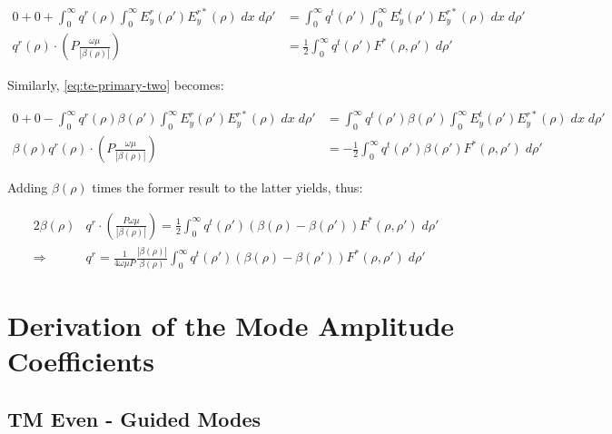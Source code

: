 \documentclass[11pt, oneside]{article}   	%
\begin{document}
\begin{align*}
0 + 0 + \int_{0}^{\infty} q^{r}(\rho) \int_{0}^{\infty} E_{y}^{r} (\rho ') E_{y}^{r*} (\rho) \; dx \; d\rho ' &= \int_{0}^{\infty} q^{t} (\rho ') \int_{0}^{\infty} E_{y}^{t}(\rho ') E_{y}^{r*}(\rho) \; dx \; d\rho ' \\
q^{r}(\rho) \cdot \left( P \frac{\omega \mu}{|\beta (\rho)|} \right) &= \frac{1}{2} \int_{0}^{\infty} q^{t} (\rho ') F^{*}(\rho, \rho') \; d\rho'
\end{align*}

\noindent Similarly, \eqref{eq:te-primary-two} becomes:

\begin{align*}
0 + 0 - \int_{0}^{\infty} q^{r}(\rho) \beta(\rho ') \int_{0}^{\infty} E_{y}^{r} (\rho ') E_{y}^{r*} (\rho) \; dx \; d\rho ' &= \int_{0}^{\infty} q^{t} (\rho ') \beta (\rho ') \int_{0}^{\infty} E_{y}^{t}(\rho ') E_{y}^{r*}(\rho) \; dx \; d\rho ' \\
\beta(\rho) q^{r}(\rho) \cdot \left( P \frac{\omega \mu}{|\beta (\rho)|} \right) &= -\frac{1}{2} \int_{0}^{\infty} q^{t} (\rho ') \beta (\rho ') F^{*}(\rho, \rho') \; d\rho'
\end{align*}

\noindent

Adding $\beta (\rho)$ times the former result to the latter yields, thus:

\begin{align}
2 \beta(\rho) &q^{r} \cdot \left( \frac{P \omega \mu}{|\beta(\rho)|} \right) = \frac{1}{2} \int_{0}^{\infty} q^{t} (\rho ') (\beta (\rho) - \beta(\rho ')) F^{*}(\rho, \rho ') \; d\rho' \nonumber \\
\Rightarrow \; &q^{r} = \frac{1}{4 \omega \mu P} \frac{|\beta(\rho)|}{\beta(\rho)} \int_{0}^{\infty} q^{t} (\rho ') (\beta (\rho) - \beta(\rho ')) F^{*}(\rho, \rho ') \; d\rho'
\end{align}







\newpage

\section{Derivation of the Mode Amplitude Coefficients}
\label{sec:coefficients}

\subsection{TM Even - Guided Modes}
\end{document}
